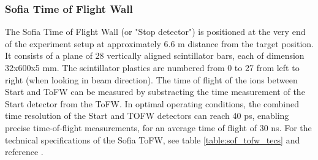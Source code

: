 \subsubsection{Sofia Time of Flight Wall}
The Sofia Time of Flight Wall (or "Stop detector") is positioned at the very end of the experiment setup at approximately 6.6 m distance from the target position. It consists of a plane of 28 vertically aligned scintillator bars, each of dimension 32x600x5 mm. The scintillator plastics are numbered from 0 to 27 from left to right (when looking in beam direction). The time of flight of the ions between Start and ToFW can be measured by substracting the time measurement of  the Start detector from the ToFW. In optimal operating conditions, the combined time resolution of the Start and TOFW detectors can reach 40 ps, enabling precise time-of-flight measurements, for an average time of flight of 30 ns\cite{martin2021fission}. For the technical specifications of the Sofia ToFW, see table \ref{table:sof_tofw_tecs} and reference \cite{bail2011time}.
\begin{figure}
\begin{floatrow}
\end{floatrow}
\end{figure}

